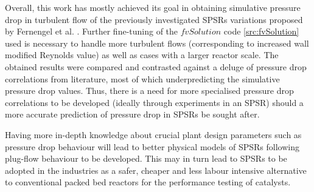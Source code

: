 Overall, this work has mostly achieved its goal in obtaining simulative pressure drop in turbulent flow of the previously investigated SPSRs variations proposed by Fernengel et al. \cite{Fernengel2020}. Further fine-tuning of the $fvSolution$ code \ref{src:fvSolution} used is necessary to handle more turbulent flows (corresponding to increased wall modified Reynolds value) as well as cases with a larger reactor scale.
The obtained results were compared and contrasted against a deluge of pressure drop correlations from literature, most of which underpredicting the simulative pressure drop values. Thus, there is a need for more specialised pressure drop correlations to be developed (ideally through experiments in an SPSR) should a more accurate prediction of pressure drop in SPSRs be sought after.

Having more in-depth knowledge about crucial plant design parameters such as pressure drop behaviour will lead to better physical models of SPSRs following plug-flow behaviour to be developed. This may in turn lead to SPSRs to be adopted in the industries as a safer, cheaper and less labour intensive alternative to conventional packed bed reactors for the performance testing of catalysts.
